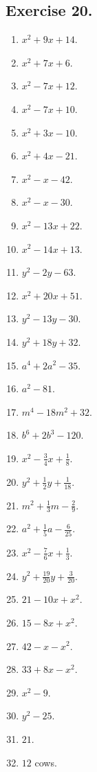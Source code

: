 \documentclass{book}
\begin{document}
\subsection*{Exercise 20.} \begin{enumerate}

\item $x^2 + 9x + 14$.

\item $x^2 + 7x + 6$.

\item $x^2 - 7x + 12$.

\item $x^2 - 7x + 10$.

\item $x^2 + 3x - 10$.

\item $x^2 + 4x - 21$.

\item $x^2 - x - 42$.

\item $x^2 - x - 30$.

\item $x^2 - 13x + 22$.

\item $x^2 - 14x + 13$.

\item $y^2 - 2y - 63$.

\item $x^2 + 20x + 51$.

\item $y^2 - 13y - 30$.

\item $y^2 + 18y + 32$.

\item $a^4 + 2a^2 - 35$.

\item  $a^2 - 81$.
\item  $m^4 - 18m^2 + 32$.
\item  $b^6 + 2b^3 - 120$.
\item  $x^2 - \frac{3}{4}x + \frac{1}{8}$.
\item  $y^2 + \frac{1}{2}y + \frac{1}{18}$.
\item  $m^2 + \frac{1}{3}m - \frac{2}{9}$.
\item  $a^2 + \frac{1}{5}a - \frac{6}{25}$.
\item  $x^2 - \frac{7}{6}x + \frac{1}{3}$.
\item  $y^2 + \frac{19}{20}y + \frac{3}{20}$.
\item  $21 - 10x + x^2$.
\item  $15 -8x + x^2$.
\item  $42 - x - x^2$.
\item  $33 + 8x - x^2$.
\item  $x^2 - 9$.
\item  $y^2 - 25$.
\item  $21$.
\item  $12$ cows.
\end{enumerate}
\end{document}
